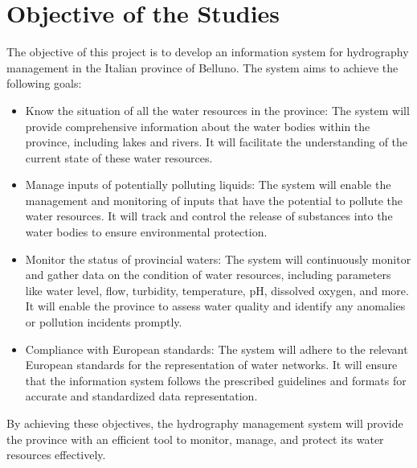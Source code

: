 \section{Objective of the Studies}
\label{sec:objectives}

The objective of this project is to develop an information system for hydrography management in the Italian province of Belluno. The system aims to achieve the following goals:
\begin{itemize}
    \item Know the situation of all the water resources in the province: The system will provide comprehensive information about the water bodies within the province, including lakes and rivers. It will facilitate the understanding of the current state of these water resources.
    \item Manage inputs of potentially polluting liquids: The system will enable the management and monitoring of inputs that have the potential to pollute the water resources. It will track and control the release of substances into the water bodies to ensure environmental protection.
    \item Monitor the status of provincial waters: The system will continuously monitor and gather data on the condition of water resources, including parameters like water level, flow, turbidity, temperature, pH, dissolved oxygen, and more. It will enable the province to assess water quality and identify any anomalies or pollution incidents promptly.
    \item Compliance with European standards: The system will adhere to the relevant European standards for the representation of water networks. It will ensure that the information system follows the prescribed guidelines and formats for accurate and standardized data representation.
\end{itemize}

By achieving these objectives, the hydrography management system will provide the province with an efficient tool to monitor, manage, and protect its water resources effectively.

